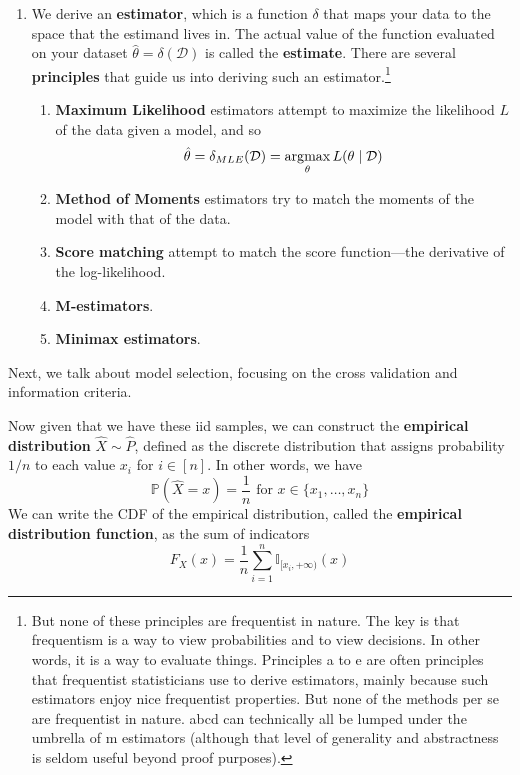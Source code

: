 \begin{enumerate}
  \item We derive an \textbf{estimator}, which is a function $\delta$ that maps your data to the space that the estimand lives in. The actual value of the function evaluated on your dataset $\hat{\theta} = \delta(\mathcal{D})$ is called the \textbf{estimate}. There are several \textbf{principles} that guide us into deriving such an estimator.\footnote{But none of these principles are frequentist in nature. The key is that frequentism is a way to view probabilities and to view decisions. In other words, it is a way to evaluate things. Principles a to e are often principles that frequentist statisticians use to derive estimators, mainly because such estimators enjoy nice frequentist properties. But none of the methods per se are frequentist in nature. abcd can technically all be lumped under the umbrella of m estimators (although that level of generality and abstractness is seldom useful beyond proof purposes).}
  \begin{enumerate}
    \item \textbf{Maximum Likelihood} estimators attempt to maximize the likelihood $L$ of the data given a model, and so 
    \begin{equation}
      \hat{\theta} = \delta_{MLE}(\mathcal{D}) = \argmax_{\theta} L(\theta \mid \mathcal{D}) 
    \end{equation}

    \item \textbf{Method of Moments} estimators try to match the moments of the model with that of the data. 

    \item \textbf{Score matching} attempt to match the score function---the derivative of the log-likelihood. 

    \item \textbf{M-estimators}. 

    \item \textbf{Minimax estimators}. 
  \end{enumerate}
\end{enumerate}

Next, we talk about model selection, focusing on the cross validation and information criteria. 

\begin{definition}
  Now given that we have these iid samples, we can construct the \textbf{empirical distribution} $\widehat{X} \sim \widehat{P}$, defined as the discrete distribution that assigns probability $1/n$ to each value $x_i$ for $i \in [n]$. In other words, we have 
  \begin{equation}
    \mathbb{P}(\widehat{X} = x) = \frac{1}{n} \text{ for } x \in \{x_1, \ldots, x_n\}
  \end{equation}
  We can write the CDF of the empirical distribution, called the \textbf{empirical distribution function}, as the sum of indicators
  \begin{equation}
    F_X (x) = \frac{1}{n} \sum_{i=1}^n \mathbb{I}_{[x_i, +\infty)} (x)
  \end{equation}
\end{definition}


